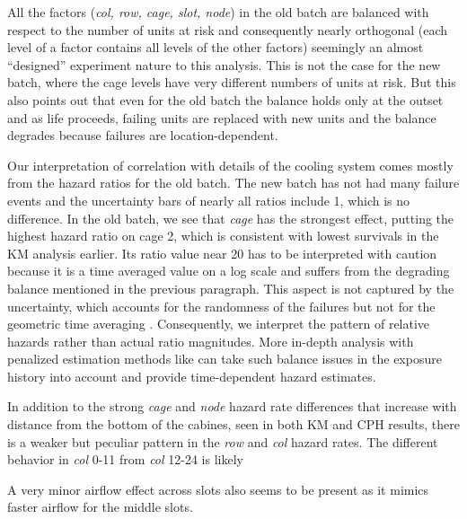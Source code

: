 All the factors ({\em col, row, cage, slot, node}) in the old batch
are balanced with respect to the number of units at risk and
consequently nearly orthogonal (each level of a factor contains all
levels of the other factors) seemingly an almost ``designed''
experiment nature to this analysis. This is not the case for the new
batch, where the cage levels have very different numbers of units at
risk. But this also points out that even for the old batch the balance
holds only at the outset and as life proceeds, failing units are
replaced with new units and the balance degrades because failures are
location-dependent.

Our interpretation of correlation with details of the cooling system
comes mostly from the hazard ratios for the old batch. The new batch
has not had many failure events and the uncertainty bars of nearly all
ratios include 1, which is no difference. In the old batch, we see
that {\em cage} has the strongest effect, putting the highest hazard
ratio on cage 2, which is consistent with lowest survivals in the KM
analysis earlier. Its ratio value near 20 has to be interpreted with
caution because it is a time averaged value on a log scale and suffers
from the degrading balance mentioned in the previous paragraph. This
aspect is not captured by the uncertainty, which accounts for the
randomness of the failures but not for the geometric time averaging
. Consequently, we interpret the pattern of
relative hazards rather than actual ratio magnitudes. More in-depth
analysis with penalized estimation methods like \cite{bender2019} can
take such balance issues in the exposure history into account and
provide time-dependent hazard estimates.

In addition to the strong {\em cage} and {\em node} hazard rate
differences that increase with distance from the bottom of the
cabines, seen in both KM and CPH results, there is a weaker but
peculiar pattern in the {\em row} and {\em col} hazard rates. The
different behavior in {\em col} 0-11 from {\em col} 12-24 is likely

 A
very minor airflow effect across slots also seems to be present as it
mimics faster airflow for the middle slots.
